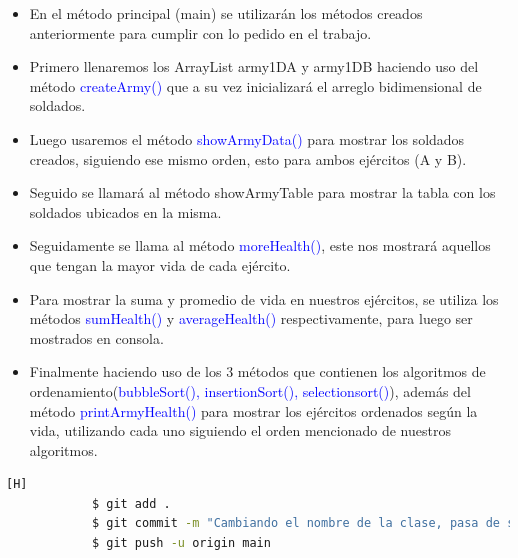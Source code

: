 \documentclass{article}
\begin{document}
        \begin{itemize}
            \item En el método principal (main) se utilizarán los métodos creados anteriormente para cumplir con lo pedido en el trabajo.
            \item Primero llenaremos los ArrayList army1DA y army1DB haciendo uso del método \textcolor{blue}{createArmy()} que a su vez inicializará el arreglo bidimensional de soldados.
            \item Luego usaremos el método \textcolor{blue}{showArmyData()} para mostrar los soldados creados, siguiendo ese mismo orden, esto para ambos ejércitos (A y B).
            \item Seguido se llamará al método showArmyTable para mostrar la tabla con los soldados ubicados en la misma.
            \item Seguidamente se llama al método \textcolor{blue}{moreHealth()}, este nos mostrará aquellos que tengan la mayor vida de cada ejército.
            \item Para mostrar la suma y promedio de vida en nuestros ejércitos, se utiliza los métodos \textcolor{blue}{sumHealth()} y \textcolor{blue}{averageHealth()} respectivamente, para luego ser mostrados en consola.
            \item Finalmente haciendo uso de los 3 métodos que contienen los algoritmos de ordenamiento(\textcolor{blue}{bubbleSort(), insertionSort(), selectionsort()}), además del método \textcolor{blue}{printArmyHealth()} para mostrar los ejércitos ordenados según la vida, utilizando cada uno siguiendo el orden mencionado de nuestros algoritmos.
        \end{itemize}
        \newpage
        
        
        
        \begin{lstlisting}[language=bash,caption={Commit: Último commit, donde se cambió el nombre de la clase a el pedido en el trabajo, el cual es: VideoJuego3.java}][H]
    		$ git add .
    		$ git commit -m "Cambiando el nombre de la clase, pasa de ser DemoBatalla a VideoJuego3"
    		$ git push -u origin main
    	\end{lstlisting}

    
    \newpage
\end{document}
